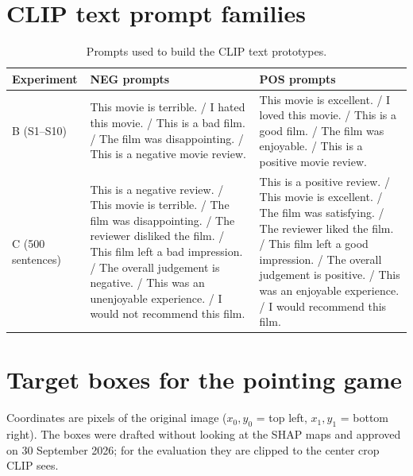 \documentclass[11pt,a4paper]{article}
\begin{document}
\section{CLIP text prompt families}\label{app:prompts}

\begin{table}[H]
  \centering
  \caption{Prompts used to build the CLIP text prototypes.}
  \label{tab:prompts}
  \small
  \begin{tabularx}{\textwidth}{@{}l Y Y@{}}
    \toprule
    Experiment & NEG prompts & POS prompts \\
    \midrule
    B (S1--S10) &
      This movie is terrible. / I hated this movie. / This is a bad film. / The film was
      disappointing. / This is a negative movie review. &
      This movie is excellent. / I loved this movie. / This is a good film. / The film was
      enjoyable. / This is a positive movie review. \\
    \midrule
    C (500 sentences) &
      This is a negative review. / This movie is terrible. / The film was disappointing. /
      The reviewer disliked the film. / This film left a bad impression. / The overall
      judgement is negative. / This was an unenjoyable experience. / I would not recommend
      this film. &
      This is a positive review. / This movie is excellent. / The film was satisfying. /
      The reviewer liked the film. / This film left a good impression. / The overall
      judgement is positive. / This was an enjoyable experience. / I would recommend this
      film. \\
    \bottomrule
  \end{tabularx}
\end{table}

\section{Target boxes for the pointing game}\label{app:boxes}

Coordinates are pixels of the original image ($x_0,y_0$ = top left, $x_1,y_1$ = bottom
right). The boxes were drafted without looking at the SHAP maps and approved on
30 September 2026; for the evaluation they are clipped to the center crop CLIP sees.
\end{document}
